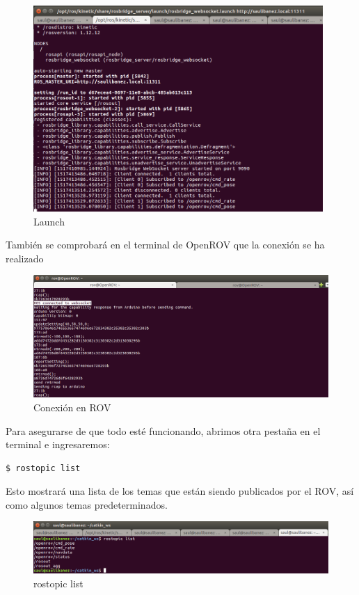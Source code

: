 \begin{figure} [hbtp]
  \begin{center}
    \includegraphics[width=11cm]{img/cap4/launch}
  \end{center}
  \caption{Launch}
  \label{fig:websocket.launch}
\end{figure}

También se comprobará en el terminal de OpenROV que la conexión se ha realizado

\begin{figure} [hbtp]
  \begin{center}
    \includegraphics[width=12cm]{img/cap4/conexion_ROV}
  \end{center}
  \caption{Conexión en ROV}
  \label{fig:conect_rov}
\end{figure}

Para asegurarse de que todo esté funcionando, abrimos otra pestaña en el terminal e ingresaremos:
\begin{lstlisting}[caption=rostopic list, label={lst:list}]
	$ rostopic list
\end{lstlisting}

Esto mostrará una lista de los temas que están siendo publicados por el ROV, así como algunos temas predeterminados.

\begin{figure} [hbtp]
  \begin{center}
    \includegraphics[width=12cm]{img/cap4/rostopic_list}
  \end{center}
  \caption{rostopic list}
  \label{fig:rostopic_list}
\end{figure}

